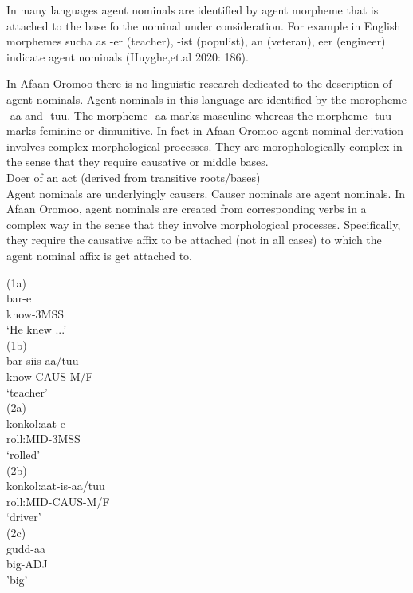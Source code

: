 \documentclass[11pt,a4paper]{article}
\begin{document}
In many languages agent nominals are identified by agent morpheme that is attached to the base fo the nominal under consideration. For example in English morphemes sucha as -er (teacher), -ist (populist), an (veteran), eer (engineer) indicate agent nominals (Huyghe,et.al 2020: 186).

In Afaan Oromoo there is no linguistic research dedicated to the description of agent nominals. Agent nominals in this language are identified by the moropheme -aa and -tuu. The morpheme -aa marks masculine whereas the morpheme -tuu marks feminine or dimunitive. In fact in Afaan Oromoo agent nominal derivation involves complex morphological processes. They are morophologically complex in the sense that they require causative or middle bases. \\

Doer of an act (derived from transitive roots/bases)\\

Agent nominals are underlyingly causers. Causer nominals are agent nominals. In Afaan Oromoo, agent nominals are created from corresponding verbs in a complex way in the sense that they involve morphological processes. Specifically, they require the causative affix to be attached (not in all cases) to which the agent nominal affix is get attached to. 

(1a)\\
\indent	 bar-e\\
\indent know-3MSS\\
\indent	‘He knew ...'\\

(1b) \\
\indent	bar-siis-aa/tuu\\
\indent know-CAUS-M/F\\
\indent ‘teacher’\\

(2a) 	\\
\indent konkol:aat-e\\
\indent roll:MID-3MSS\\
\indent ‘rolled’\\

(2b) \\	
\indent konkol:aat-is-aa/tuu\\
\indent roll:MID-CAUS-M/F\\
\indent ‘driver’\\

(2c) \\
\indent gudd-aa\\
\indent big-ADJ\\
\indent 'big'\\
\end{document}

